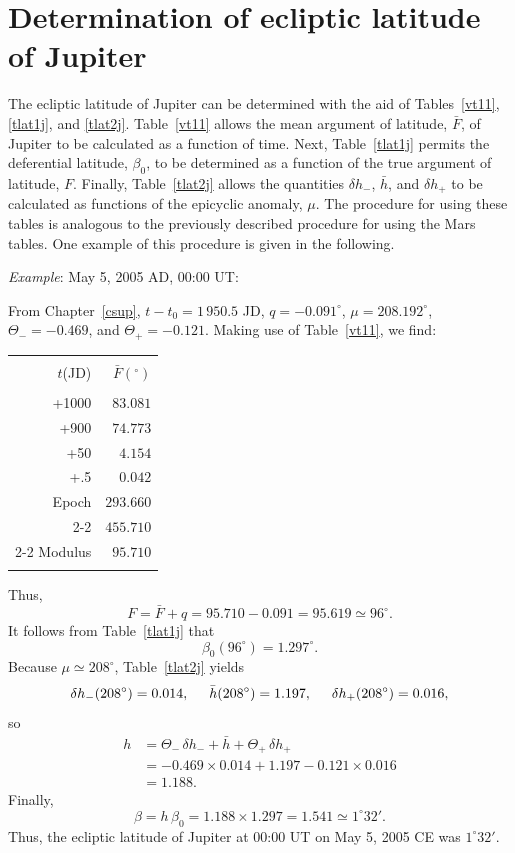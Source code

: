 \section{Determination of ecliptic latitude of Jupiter}
The ecliptic latitude of Jupiter can be determined with the aid of Tables~\ref{vt11}, \ref{tlat1j}, and \ref{tlat2j}. Table~\ref{vt11} allows
the mean argument of latitude, $\bar{F}$, of Jupiter to be calculated as a function of
time. Next, Table~\ref{tlat1j} permits the deferential latitude, $\beta_0$, to
be determined as a function of the true argument of latitude, $F$. Finally, Table~\ref{tlat2j} allows the quantities
$\delta h_-$, $\bar{h}$, and $\delta h_+$ to be calculated as functions of the epicyclic
anomaly, $\mu$.  The procedure for using these tables is analogous to the previously described procedure for
using the Mars tables.
One example of this procedure is given in the following.

\begin{center}
{\em Example}: May 5, 2005 AD, 00:00 UT:
\end{center}
From Chapter~\ref{csup}, $t-t_0=1\,950.5$ JD, 
$q= -0.091^\circ$,  $\mu= 208.192^\circ$, $\Theta_-=-0.469$, and
$\Theta_+ = -0.121$.
 Making use of
Table~\ref{vt11}, we find:
\begin{center}
\begin{tabular}{rr}
&\\
$t$(JD) & $\bar{F}(^\circ)$\\[-2ex]
&\\
+1000 & $83.081$ \\
+900 & $74.773$\\
+50 & $4.154$ \\
+.5 & $0.042$\\
Epoch & $293.660$ \\\cline{2-2}
&$455.710$ \\\cline{2-2}
Modulus & $95.710$ \\ 
&\\
\end{tabular}
\end{center}
Thus,
$$
F = \bar{F} + q =95.710-0.091 = 95.619\simeq 96^\circ.
$$
It follows from Table~\ref{tlat1j} that
$$
\beta_0(96^\circ) = 1.297^\circ.
$$
Because  $\mu\simeq 208^\circ$, Table~\ref{tlat2j} yields
$$
\delta h_-(208^\circ) = 0.014,\mbox{\hspace{0.5cm}}\bar{h}(208^\circ)=1.197, \mbox{\hspace{0.5cm}}\delta h_+(208^\circ) = 0.016,
$$
so
\begin{align*}
h& = \Theta_-\,\delta h_- + \bar{h}+\Theta_+\,\delta h_+ \\[0.5ex]
&= -0.469\times 0.014 +1.197-0.121\times 0.016\\[0.5ex]
& = 1.188.
\end{align*}
Finally,
$$
\beta = h\,\beta_0 = 1.188\times 1.297 = 1.541 \simeq 1^\circ 32'.
$$
Thus,
the ecliptic latitude of Jupiter at 00:00 UT on May 5, 2005 CE was $1^\circ 32'$.

